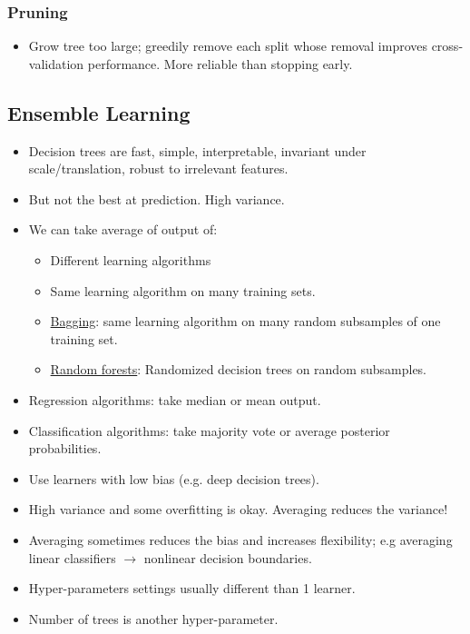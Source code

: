\documentclass[10pt]{article}
\begin{document}
\subsubsection*{Pruning}
	\begin{itemize}
		\item Grow tree too large; greedily remove each split whose removal improves cross-validation performance. More reliable than stopping early.
	\end{itemize}
	
\subsection*{Ensemble Learning}
\begin{itemize}
	\item Decision trees are fast, simple, interpretable, invariant under scale/translation, robust to irrelevant features.
	\item But not the best at prediction. High variance.
	\item We can take average of output of:
		\begin{itemize}
			\item Different learning algorithms
			\item Same learning algorithm on many training sets.
			\item \underline{Bagging}: same learning algorithm on many random subsamples of one training set.
			\item \underline{Random forests}: Randomized decision trees on random subsamples.
		\end{itemize}
	\item Regression algorithms: take median or mean output.
	\item Classification algorithms: take majority vote or average posterior probabilities.
	\item Use learners with low bias (e.g. deep decision trees).
	\item High variance and some overfitting is okay. Averaging reduces the variance!
	\item Averaging sometimes reduces the bias and increases flexibility; e.g averaging linear classifiers $\rightarrow$ nonlinear decision boundaries.
	\item Hyper-parameters settings usually different than 1 learner.
	\item Number of trees is another hyper-parameter.
\end{itemize}
\end{document}

